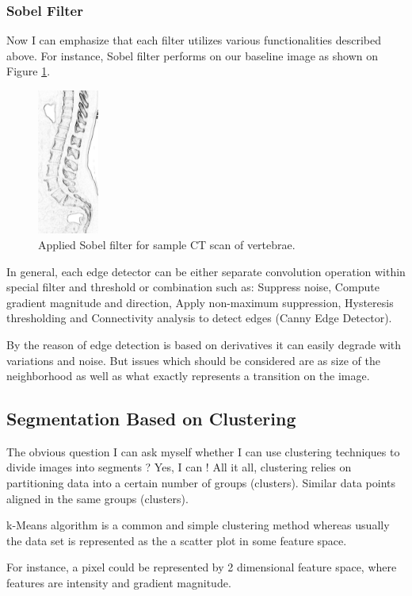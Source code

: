 \subsubsection{Sobel Filter}
Now I can emphasize that each filter utilizes various functionalities described above.
For instance, Sobel filter performs on our baseline image as shown on Figure \ref{fig:sobel}.

\begin{figure}[h] 
\centering
\includegraphics[width=2cm]{images/sample_vertebrae_sobel.jpeg}
    \caption {Applied Sobel filter for sample CT scan of vertebrae.}
    \label{fig:sobel}
\end{figure}

In general, each edge detector can be either separate convolution operation within special filter and threshold or combination such as: Suppress noise, Compute gradient magnitude and direction, Apply non-maximum suppression, Hysteresis thresholding and Connectivity analysis to detect edges (Canny Edge Detector). 

By the reason of edge detection is based on derivatives it can easily degrade with variations and noise. But issues which should be considered are as size of the neighborhood as well as what exactly represents a transition on the image. 

\subsection{Segmentation Based on Clustering}
The obvious question I can ask myself whether I can use clustering techniques to divide images into segments ? Yes, I can ! All it all, clustering relies on partitioning data into a certain number of groups (clusters). Similar data points aligned in the same groups (clusters).

k-Means algorithm is a common and simple clustering method whereas usually the data set is represented as the a scatter plot in some feature space.

For instance, a pixel could be represented by 2 dimensional feature space, where features are intensity and gradient magnitude.

